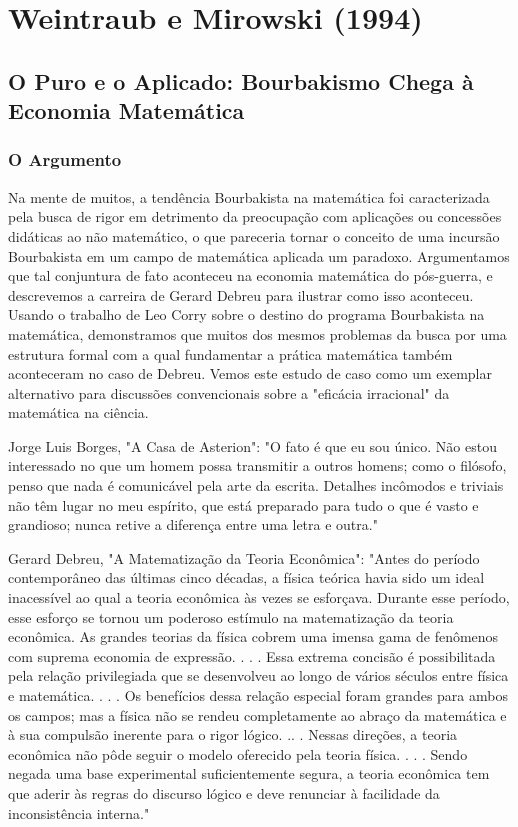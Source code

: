 \documentclass[a4paper,12pt]{article}[abntex2]
\begin{document}
\section{\textbf{Weintraub e Mirowski (1994)}}
\subsection{\textbf{O Puro e o Aplicado: Bourbakismo Chega à Economia Matemática}}
\subsubsection{\textbf{O Argumento}}
Na mente de muitos, a tendência Bourbakista na matemática foi caracterizada pela busca de rigor em detrimento da preocupação com aplicações ou concessões didáticas ao não matemático, o que pareceria tornar o conceito de uma incursão Bourbakista em um campo de matemática aplicada um paradoxo. Argumentamos que tal conjuntura de fato aconteceu na economia matemática do pós-guerra, e descrevemos a carreira de Gerard Debreu para ilustrar como isso aconteceu. Usando o trabalho de Leo Corry sobre o destino do programa Bourbakista na matemática, demonstramos que muitos dos mesmos problemas da busca por uma estrutura formal com a qual fundamentar a prática matemática também aconteceram no caso de Debreu. Vemos este estudo de caso como um exemplar alternativo para discussões convencionais sobre a "eficácia irracional" da matemática na ciência.

Jorge Luis Borges, "A Casa de Asterion":
"O fato é que eu sou único. Não estou interessado no que um homem possa transmitir a outros homens; como o filósofo, penso que nada é comunicável pela arte da escrita. Detalhes incômodos e triviais não têm lugar no meu espírito, que está preparado para tudo o que é vasto e grandioso; nunca retive a diferença entre uma letra e outra."

Gerard Debreu, "A Matematização da Teoria Econômica":
"Antes do período contemporâneo das últimas cinco décadas, a física teórica havia sido um ideal inacessível ao qual a teoria econômica às vezes se esforçava. Durante esse período, esse esforço se tornou um poderoso estímulo na matematização da teoria econômica. As grandes teorias da física cobrem uma imensa gama de fenômenos com suprema economia de expressão. . . . Essa extrema concisão é possibilitada pela relação privilegiada que se desenvolveu ao longo de vários séculos entre física e matemática. . . . Os benefícios dessa relação especial foram grandes para ambos os campos; mas a física não se rendeu completamente ao abraço da matemática e à sua compulsão inerente para o rigor lógico. .. . Nessas direções, a teoria econômica não pôde seguir o modelo oferecido pela teoria física. . . . Sendo negada uma base experimental suficientemente segura, a teoria econômica tem que aderir às regras do discurso lógico e deve renunciar à facilidade da inconsistência interna."
\end{document}
